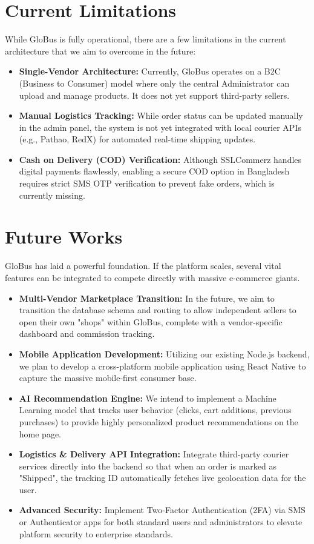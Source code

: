\section{Current Limitations}
While GloBus is fully operational, there are a few limitations in the current architecture that we aim to overcome in the future:
\begin{itemize}
    \item \textbf{Single-Vendor Architecture:} Currently, GloBus operates on a B2C (Business to Consumer) model where only the central Administrator can upload and manage products. It does not yet support third-party sellers.
    \item \textbf{Manual Logistics Tracking:} While order status can be updated manually in the admin panel, the system is not yet integrated with local courier APIs (e.g., Pathao, RedX) for automated real-time shipping updates.
    \item \textbf{Cash on Delivery (COD) Verification:} Although SSLCommerz handles digital payments flawlessly, enabling a secure COD option in Bangladesh requires strict SMS OTP verification to prevent fake orders, which is currently missing.
\end{itemize}

\section{Future Works}
GloBus has laid a powerful foundation. If the platform scales, several vital features can be integrated to compete directly with massive e-commerce giants.
\begin{itemize}
    \item \textbf{Multi-Vendor Marketplace Transition:} In the future, we aim to transition the database schema and routing to allow independent sellers to open their own "shops" within GloBus, complete with a vendor-specific dashboard and commission tracking.
    \item \textbf{Mobile Application Development:} Utilizing our existing Node.js backend, we plan to develop a cross-platform mobile application using React Native to capture the massive mobile-first consumer base.
    \item \textbf{AI Recommendation Engine:} We intend to implement a Machine Learning model that tracks user behavior (clicks, cart additions, previous purchases) to provide highly personalized product recommendations on the home page.
    \item \textbf{Logistics \& Delivery API Integration:} Integrate third-party courier services directly into the backend so that when an order is marked as "Shipped", the tracking ID automatically fetches live geolocation data for the user.
    \item \textbf{Advanced Security:} Implement Two-Factor Authentication (2FA) via SMS or Authenticator apps for both standard users and administrators to elevate platform security to enterprise standards.
\end{itemize}

